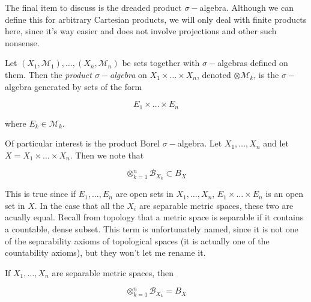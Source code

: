 \documentclass[main.tex]{subfiles}
\begin{document}
The final item to discuss is the dreaded product $\sigma-$algebra. Although we can define this for arbitrary Cartesian products, we will only deal with finite products here, since it's way easier and does not involve projections and other such nonsense.

\begin{definition}
Let $(X_1, \mathcal{M}_1), \dots, (X_n, \mathcal{M}_n)$ be sets together with $\sigma-$algebras defined on them. Then the \emph{product $\sigma-$algebra} on $X_1 \times \dots \times X_n$, denoted $\otimes \mathcal{M}_k$, is the $\sigma-$algebra generated by sets of the form 

\[
E_1 \times \dots \times E_n
\]

where $E_k \in \mathcal{M}_k$.
\end{definition}

Of particular interest is the product Borel $\sigma-$algebra. Let $X_1, \dots, X_n$ and let $X = X_1 \times \dots \times X_n$. Then we note that 

\begin{equation}
\otimes_{k=1}^n \mathcal{B}_{X_k} \subset B_X
\end{equation}

This is true since if $E_1, \dots, E_n$ are open sets in $X_1, \dots, X_n$, $E_1 \times \dots \times E_n$ is an open set in $X$. In the case that all the $X_i$ are separable metric spaces, these two are acually equal. Recall from topology that a metric space is separable if it contains a countable, dense subset. This term is unfortunately named, since it is not one of the separability axioms of topological spaces (it is actually one of the countability axioms), but they won't let me rename it.

\begin{proposition}
If $X_1, \dots, X_n$ are separable metric spaces, then

\begin{equation}
\otimes_{k=1}^n \mathcal{B}_{X_k} = B_X
\end{equation}
\end{proposition}
\end{document}
